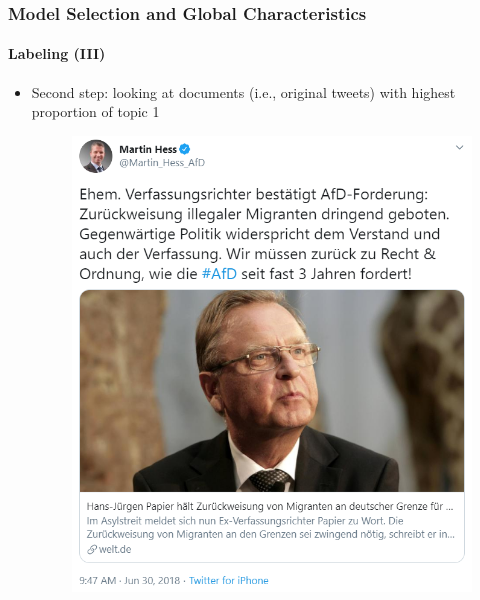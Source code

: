 \documentclass[xcolor=dvipsnames]{beamer}
\begin{document}
\begin{frame}
\frametitle{Model Selection and Global Characteristics}
\framesubtitle{Labeling (III)}
\begin{itemize}
\item Second step: looking at documents (i.e., original tweets) with highest proportion of topic 1
	\begin{figure}[h!]
  	\centering
  	\includegraphics[scale = 0.40]{../plots/presentation/martin_hess_topic1.png}
	\end{figure}
\end{itemize}
\end{frame}
\end{document}
